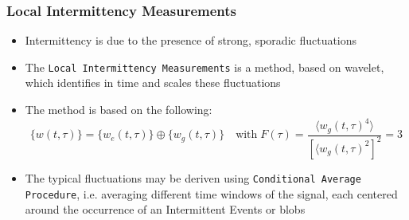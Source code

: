 \documentclass[t,10pt]{beamer}
\begin{document}
\begin{frame}
  \frametitle{Local Intermittency Measurements}
  \begin{itemize}
\item Intermittency is due to the presence of strong, sporadic fluctuations
\item The \textcolor{ta3chameleon}{\texttt{Local Intermittency
      Measurements}} is a method, based on wavelet, which identifies in time and
  scales these fluctuations {\footnotesize\parencite{Antoni:2001tm}}
  \item The method is based on the following:
\begin{equation*}
\{w(t,\tau)\} = \{w_e(t,\tau)\}\oplus \{w_g(t,\tau)\} \quad
\text{with} \;
F(\tau)=\frac{\langle w_g(t,\tau)^4\rangle}{[\langle w_g(t,\tau)^2]^2}
= 3
\end{equation*}
\item The typical fluctuations may be deriven using
  \textcolor{ta3chameleon}{\texttt{Conditional Average Procedure}},
  i.e. averaging different time windows of the signal, each 
  centered around the occurrence of an
  \alert{Intermittent Events} or \alert{blobs}

  \end{itemize}
\end{frame}
\end{document}
